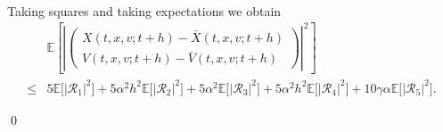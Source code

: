 \documentclass[12pt]{article}
\numberwithin{equation}{section}
\renewenvironment{proof}%
  {\begin{trivlist}%
   \item[]\ignorespaces}%
  {\qed\end{trivlist}}
\begin{document}
\begin{proof}
\begin{align}
\end{align}
%
Taking squares and taking expectations we obtain
\begin{equation}
\label{eq:one-step-strong-split-noI}
\begin{aligned}
&
\mathbb E
\left[
\left|
\left(
\begin{aligned}
X(t,x,v;t+h)-\bar X(t,x,v;t+h)
\\
V(t,x,v;t+h)-\bar V(t,x,v;t+h)
\end{aligned}
\right)
\right|^2
\right]
\\
\leq&
5\mathbb E
\Big[\big|
\mathcal R_1
\big|^2\Big]
+
5\alpha^2h^2\mathbb E
\Big[\big|
\mathcal R_2
\big|^2\Big]
+
5\alpha^2 
\mathbb E
\Big[\big|
\mathcal R_3
\big|^2\Big]
+
5\alpha^2h^2
\mathbb E
\Big[\big|
\mathcal R_4
\big|^2\Big]
+
10\gamma\alpha
\mathbb E
\Big[\big|
\mathcal R_5
\big|^2\Big].
\end{aligned}
\end{equation}


\end{proof}
\end{document}

